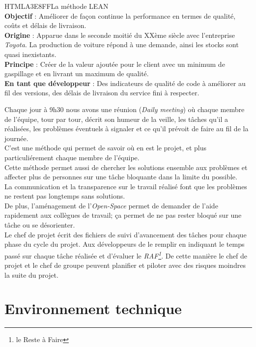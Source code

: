  \begin{colbox}{{HTML}{A3E8FF}}{La méthode LEAN\\ }
   \textbf{Objectif} : Améliorer de façon continue la performance en termes de qualité, coûts et délais de livraison.
   \\\textbf{Origine} : Apparue dans le seconde moitié du XXème siècle avec l'entreprise \textit{Toyota}. La production de voiture répond à une demande, ainsi les stocks sont quasi inexistants.
   \\\textbf{Principe} : Créer de la valeur ajoutée pour le client avec un minimum de gaspillage et en livrant un maximum de qualité.
   \\\textbf{En tant que développeur} : Des indicateurs de qualité de code à améliorer au fil des versions, des délais de livraison du service fini à respecter.
 \end{colbox}

 Chaque jour à 9h30 nous avons une réunion (\textit{Daily meeting}) où chaque membre de l'équipe, tour par tour, décrit son humeur de la veille, les tâches qu'il a réalisées, les problèmes éventuels à signaler et ce qu'il prévoit de faire au fil de la journée.
 \\ C'est une méthode qui permet de savoir où en est le projet, et plus particuliérement chaque membre de l'équipe. \\Cette méthode permet aussi de chercher les solutions ensemble aux problèmes et affecter plus de personnes sur une tâche bloquante dans la limite du possible.
\\La communication et la transparence sur le travail réalisé font que les problèmes ne restent pas longtemps sans solutions.
\\De plus, l'aménagement de l'\textit{Open-Space} permet de demander de l'aide rapidement aux collègues de travail; ça permet de ne pas rester bloqué sur une tâche ou se désorienter.
\\Le chef de projet écrit des fichiers de suivi d'avancement des tâches pour chaque phase du cycle du projet. Aux développeurs de le remplir en indiquant le temps passé sur chaque tâche réalisée et d'évaluer le \textit{RAF\footnote{le Reste à Faire}}. De cette manière le chef de projet et le chef de groupe peuvent planifier et piloter avec des risques moindres la suite du projet.

\chapter{Environnement technique}
